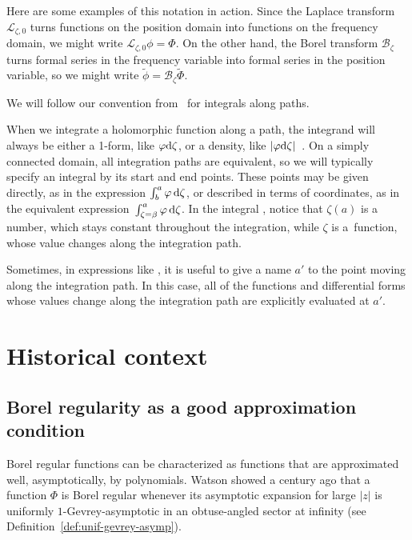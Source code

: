 \documentclass[pdftex]{sigma}
\newcommand{\series}[1]{\tilde{#1}}
\newcommand{\laplace}{\mathcal{L}}
\newcommand{\borel}{\mathcal{B}}
\numberwithin{equation}{section}
\begin{document}
Here are some examples of this notation in action. Since the Laplace transform $\laplace_{\zeta, 0}$ turns functions on the position domain into functions on the frequency domain, we might write ${\laplace_{\zeta,0} \phi = \Phi}$. On the other hand, the Borel transform $\borel_\zeta$ turns formal series in the frequency variable into formal series in the position variable, so we might write $\series{\phi} = \borel_\zeta \series{\Phi}$.

We will follow our convention from~\cite{reg-sing-volterra} for integrals along paths.
\begin{notation*}
When we integrate a holomorphic function along a path, the integrand will always be either a 1-form, like $\varphi {\rm d}\zeta$, or a density, like $|\varphi {\rm d}\zeta|$~\cite[Section~1.8]{local-viewpoint}. On a simply connected domain, all integration paths are equivalent, so we will typically specify an integral by its start and end points. These points may be given directly, as in the expression $\int_b^a \varphi \,{\rm d}\zeta$, or described in terms of coordinates, as in the equivalent expression~${\int_{\zeta = \beta}^a \varphi\, {\rm d}\zeta}$. In the integral
,
notice that $\zeta(a)$ is a number, which stays constant throughout the integration, while $\zeta$ is a~function, whose value changes along the integration path.

Sometimes, in expressions like
,
it is useful to give a name $a'$ to the point moving along the integration path. In this case, all of the functions and differential forms whose values change along the integration path are explicitly evaluated at $a'$.
\end{notation*}
%
\section{Historical context}\label{sec:historical-context}
%
\subsection{Borel regularity as a good approximation condition}
Borel regular functions can be characterized as functions that are approximated well, asymptotically, by polynomials. Watson showed a century ago \cite[Part II, Section 9]{watson2} that a function $\Phi$ is Borel regular whenever its asymptotic expansion for large $|z|$ is uniformly $1$-Gevrey-asymptotic in an obtuse-angled sector at infinity (see Definition~\ref{def:unif-gevrey-asymp}).
\end{document}
